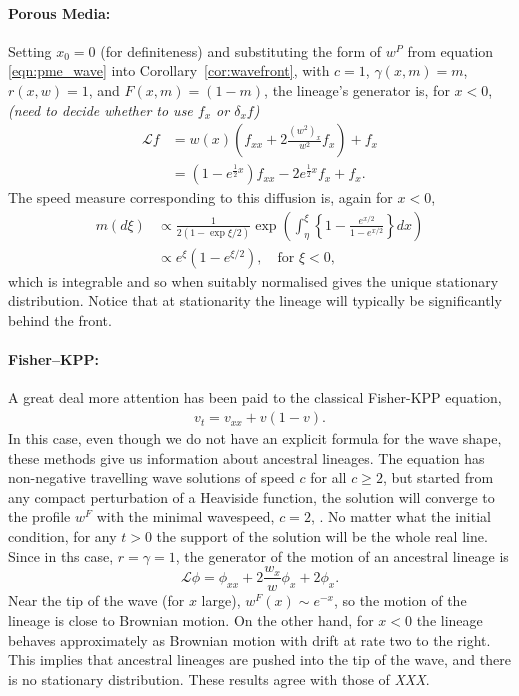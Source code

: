 \documentclass[12pt]{article}
\newcommand{\Lgen}{\mathcal{L}}    %
\newcommand{\comment}[1]{{\color{blue} \it #1}}
\begin{document}
\paragraph{Porous Media:}
Setting $x_0=0$ (for definiteness) and substituting
the form of $w^P$ from equation \eqref{eqn:pme_wave}
into Corollary~\ref{cor:wavefront},
with $c=1$,
$\gamma(x, m) = m$,
$r(x,w) = 1$,
and $F(x, m) = (1 - m)$,
the lineage's generator is, for $x < 0$,
\comment{(need to decide whether to use $f_x$ or $\delta_x f$)}
\begin{align*}
    \Lgen f
    &=
        w(x)
        \left(
         f_{xx}
         +
         2 \frac{(w^2)_x}{w^2} f_x
        \right)
        + f_x \\
    &=
        \left(1 - e^{\frac{1}{2} x} \right)
        f_{xx}
        -
        2 e^{\frac{1}{2} x} f_x
        +
        f_x .
\end{align*}
The speed measure corresponding to this diffusion is,
again for $x < 0$,
\begin{align*}
    m(d\xi)
    &\propto
        \frac{ 1 }{ 2 (1 - \exp{\xi/2}) }
        \exp\left(
            \int_\eta^\xi \left\{
                1 - \frac{e^{x/2}}{1 - e^{x/2}}
            \right\} dx
        \right) \\
    &\propto
        e^\xi\left(1-e^{\xi/2}\right),
        \quad
        \text{for } \xi < 0 ,
\end{align*}
which is integrable and so when suitably normalised gives the unique stationary distribution.
Notice that at stationarity
the lineage will typically be significantly behind the front. 

\paragraph{Fisher--KPP:}
A great deal more attention has been paid to the classical Fisher-KPP equation,
\begin{align} \label{eqn:fkpp}
    v_t = v_{xx} + v (1-v) .
\end{align}
In this case,
even though we do not have an explicit formula for the wave shape,
these methods give us information about ancestral lineages.
The equation has non-negative travelling wave solutions of speed $c$ for all $c \geq 2$, 
but started from any compact perturbation of a Heaviside function, the 
solution will converge to the profile $w^F$ with the minimal wavespeed, $c=2$,
\cite{kolmogorov/petrovsky/piscounov:1937,bramson:1983}.
No matter what the initial condition,
for any $t>0$ the support of the 
solution will be the whole real line. 
Since in ths case, $r = \gamma = 1$,
the generator of the motion of an ancestral lineage is
$$
    \Lgen \phi
    =
    \phi_{xx} + 2 \frac{w_x}{w} \phi_x + 2 \phi_x .
$$
Near the tip of the wave (for $x$ large), $w^F(x) \sim e^{-x}$,
so the motion of the lineage is close to Brownian motion.
On the other hand, for $x < 0$ the lineage behaves approximately as
Brownian motion with drift at rate two to the right.
This implies that
ancestral lineages are pushed into the tip of the wave,
and there is no stationary distribution.
These results agree with those of \comment{XXX}.
\end{document}
